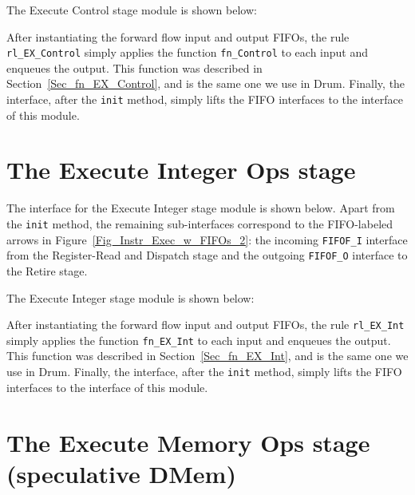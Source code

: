 
The Execute Control stage module is shown below:


After instantiating the forward flow input and output FIFOs, the rule
\verb|rl_EX_Control| simply applies the function \verb|fn_Control| to
each input and enqueues the output.  This function was described in
Section~\ref{Sec_fn_EX_Control}, and is the same one we use in Drum.
Finally, the interface, after the \verb|init| method, simply lifts the
FIFO interfaces to the interface of this module.


\section{The Execute Integer Ops stage}

\label{Sec_Fife_EX_Int_stage}

The interface for the Execute Integer stage module is shown below.
Apart from the \verb|init| method, the remaining sub-interfaces
correspond to the FIFO-labeled arrows in
Figure~\ref{Fig_Instr_Exec_w_FIFOs_2}: the incoming \verb|FIFOF_I|
interface from the Register-Read and Dispatch stage and the outgoing
\verb|FIFOF_O| interface to the Retire stage.


The Execute Integer stage module is shown below:


After instantiating the forward flow input and output FIFOs, the rule
\verb|rl_EX_Int| simply applies the function \verb|fn_EX_Int| to each
input and enqueues the output.  This function was described in
Section~\ref{Sec_fn_EX_Int}, and is the same one we use in Drum.
Finally, the interface, after the \verb|init| method, simply lifts the
FIFO interfaces to the interface of this module.


\section{The Execute Memory Ops stage (speculative DMem)}

\label{Sec_Fife_DMem_stage}

